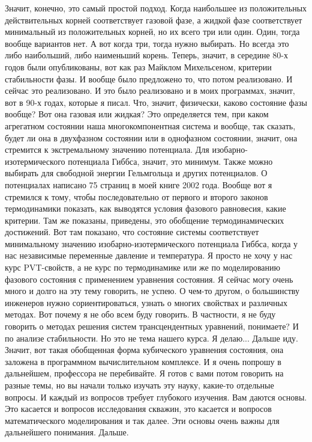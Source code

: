 \documentclass[main.tex]{subfiles}
\begin{document}
Значит, конечно, это самый простой подход.
Когда наибольшее из положительных действительных корней соответствует газовой фазе, а жидкой фазе соответствует минимальный из положительных корней, но их всего три или один.
Один, тогда вообще вариантов нет.
А вот когда три, тогда нужно выбирать.
Но всегда это либо наибольший, либо наименьший корень.
Теперь, значит, в середине 80-х годов были опубликованы, вот как раз Майклом Михельсеном, критерии стабильности фазы.
И вообще было предложено то, что потом реализовано.
И сейчас это реализовано.
И это было реализовано и в моих программах, значит, вот в 90-х годах, которые я писал.
Что, значит, физически, каково состояние фазы вообще?
Вот она газовая или жидкая?
Это определяется тем, при каком агрегатном состоянии наша многокомпонентная система и вообще, так сказать, будет ли она в двухфазном состоянии или в однофазном состоянии, значит, она стремится к экстремальному значению потенциала.
Для изобарно-изотермического потенциала Гиббса, значит, это минимум.
Также можно выбирать для свободной энергии Гельмгольца и других потенциалов.
О потенциалах написано 75 страниц в моей книге 2002 года.
Вообще вот я стремился к тому, чтобы последовательно от первого и второго законов термодинамики показать, как выводятся условия фазового равновесия, какие критерии.
Там же показаны, приведены, это обобщение термодинамических достижений.
Вот там показано, что состояние системы соответствует минимальному значению изобарно-изотермического потенциала Гиббса, когда у нас независимые переменные давление и температура.
Я просто не хочу у нас курс PVT-свойств, а не курс по термодинамике или же по моделированию фазового состояния с применением уравнения состояния.
Я сейчас могу очень много и долго на эту тему говорить, не успею.
О чем-то другом, о большинству инженеров нужно сориентироваться, узнать о многих свойствах и различных методах.
Вот почему я не обо всем буду говорить.
В частности, я не буду говорить о методах решения систем трансцендентных уравнений, понимаете?
И по анализе стабильности.
Но это не тема нашего курса.
Я делаю... Дальше иду.
Значит, вот такая обобщенная форма кубического уравнения состояния, она заложена в программном вычислительном комплексе.
И я очень попрошу в дальнейшем, профессора не перебивайте.
Я готов с вами потом говорить на разные темы, но вы начали только изучать эту науку, какие-то отдельные вопросы.
И каждый из вопросов требует глубокого изучения.
Вам даются основы.
Это касается и вопросов исследования скважин, это касается и вопросов математического моделирования и так далее.
Эти основы очень важны для дальнейшего понимания.
Дальше.
\end{document}
